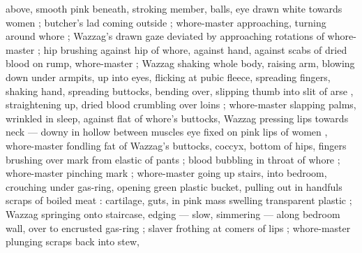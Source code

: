 above, smooth pink beneath, stroking member, balls, eye drawn white towards women ; butcher's lad coming outside ; whore-master approaching, turning around whore ; Wazzag's drawn gaze deviated by approaching rotations of whore-master ; hip brushing against hip of whore, against hand, against scabs of dried blood on rump, whore-master  ; Wazzag shaking whole body, raising arm, blowing down under armpits, up into eyes, flicking at pubic fleece, spreading fingers, shaking hand, spreading buttocks, bending over, slipping thumb into slit of arse , straightening up, dried blood crumbling over loins  ; whore-master slapping palms, wrinkled in sleep, against flat of whore's buttocks, Wazzag pressing lips towards neck --- downy in hollow between muscles {\dashcom} eye fixed on pink lips of women , whore-master fondling fat of Wazzag's buttocks, coccyx, bottom of hips, fingers brushing over mark from elastic of pants ; blood bubbling in throat of whore ; whore-master pinching mark  ; whore-master going up stairs, into bedroom, crouching under gas-ring, opening green plastic bucket, pulling out in handfuls scraps of boiled meat : cartilage, guts, in pink mass swelling transparent plastic ; Wazzag springing onto staircase, edging --- slow, simmering --- along bedroom wall, over to encrusted gas-ring ; slaver frothing at comers of lips ; whore-master plunging scraps back into stew, 
